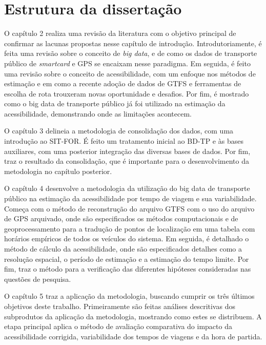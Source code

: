 \documentclass[        
    a4paper,          %
    12pt,             %
    chapter=TITLE,    %
    section=Title,    %
    subsection=Title, %
    oneside,          %
    english,          %
    spanish,          %
    brazil,           %
    fleqn             %
]{abntex2}
\begin{document}
  \hypertarget{estrutura-da-dissertacao}{%
  \section{Estrutura da dissertação}\label{estrutura-da-dissertacao}}
  
  O capítulo 2 realiza uma revisão da literatura com o objetivo principal de confirmar as lacunas propostas nesse capítulo de introdução. Introdutoriamente, é feita uma revisão sobre o conceito de \emph{big data}, e de como os dados de transporte público de \emph{smartcard} e GPS se encaixam nesse paradigma. Em seguida, é feito uma revisão sobre o conceito de acessibilidade, com um enfoque nos métodos de estimação e em como a recente adoção de dados de GTFS e ferramentas de escolha de rota trouxeram novas oportunidade e desafios. Por fim, é mostrado como o big data de transporte público já foi utilizado na estimação da acessibilidade, demonstrando onde as limitações acontecem.
  
  O capítulo 3 delineia a metodologia de consolidação dos dados, com uma introdução ao SIT-FOR. É feito um tratamento inicial ao BD-TP e às bases auxiliares, com uma posterior integração das diversas bases de dados. Por fim, traz o resultado da consolidação, que é importante para o desenvolvimento da metodologia no capítulo posterior.
  
  O capítulo 4 desenvolve a metodologia da utilização do big data de transporte público na estimação da acessibilidade por tempo de viagem e sua variabilidade. Começa com o método de reconstrução do arquivo GTFS com o uso do arquivo de GPS arquivado, onde são especificados os métodos computacionais e de geoprocessamento para a tradução de pontos de localização em uma tabela com horários empíricos de todos os veículos do sistema. Em seguida, é detalhado o método de cálculo da acessibilidade, onde são especificados detalhes como a resolução espacial, o período de estimação e a estimação do tempo limite. Por fim, traz o método para a verificação das diferentes hipóteses consideradas nas questões de pesquisa.
  
  O capítulo 5 traz a aplicação da metodologia, buscando cumprir os três últimos objetivos deste trabalho. Primeiramente são feitas análises descritivas dos subprodutos da aplicação da metodologia, mostrando como estes se distribuem. A etapa principal aplica o método de avaliação comparativa do impacto da acessibilidade corrigida, variabilidade dos tempos de viagens e da hora de partida.
  
\end{document}
